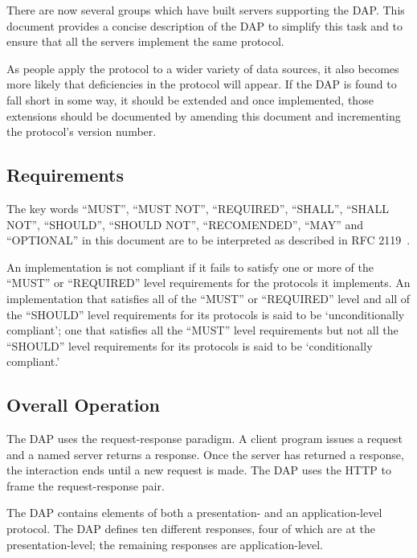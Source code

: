 \documentclass{article}
\begin{document}
There are now several groups which have built servers
  supporting the
\ac{DAP}. This document provides a concise description of the \ac{DAP} to
simplify this task and to ensure that all the servers implement the same
protocol.

As people apply the protocol to a wider variety of data sources, it also
becomes more likely that deficiencies in the protocol will appear. If the
\ac{DAP} is found to fall short in some way, it should be extended and once
implemented, those extensions should be documented by amending this document
and incrementing the protocol's version number.

\subsection{Requirements}

The key words ``MUST'', ``MUST NOT'', ``REQUIRED'', ``SHALL'', ``SHALL NOT'',
``SHOULD'', ``SHOULD NOT'', ``RECOMENDED'', ``MAY'' and ``OPTIONAL'' in this
document are to be interpreted as described in RFC 2119~\cite{rfc2119}.

An implementation is not compliant if it fails to satisfy one or more of the
``MUST'' or ``REQUIRED'' level requirements for the protocols it implements.
An implementation that satisfies all of the ``MUST'' or ``REQUIRED'' level
and all of the ``SHOULD'' level requirements for its protocols is said to be
`unconditionally compliant'; one that satisfies all the ``MUST'' level
requirements but not all the ``SHOULD'' level requirements for its protocols
is said to be `conditionally compliant.'

\subsection{Overall Operation}

The \ac{DAP} uses the request-response
paradigm. A client program issues a request and a named server returns a
response.  Once the server has returned a response, the interaction ends
until a new request is made. The \ac{DAP} uses the \ac{HTTP} to frame the
request-response pair. 

The \ac{DAP} contains elements of both a presentation- and an
application-level protocol. The \ac{DAP} defines ten different responses,
four of which are at the presentation-level; the remaining responses are
application-level.

\end{document}
